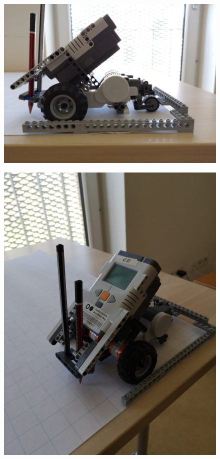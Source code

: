 \documentclass[11pt,a4paper,titlepage]{article}
\begin{document}
\begin{figure}[H]
\centering
  \centering
  \includegraphics[width=0.8\linewidth]{1}
  \label{fig:test1}
\end{figure}
\begin{figure}[H]
\centering
  \centering
  \includegraphics[width=0.8\linewidth]{isometric}
  \label{fig:test1}
\end{figure}
\end{document}
